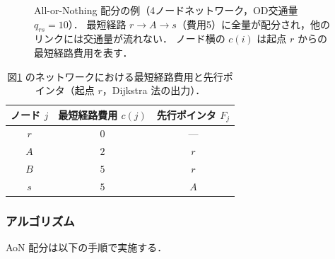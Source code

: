 \begin{figure}[hbtp]
  \centering
  
  \caption{All-or-Nothing 配分の例（4ノードネットワーク，OD交通量 $q_{rs}=10$）．
           最短経路 $r \to A \to s$（費用5）に全量が配分され，他のリンクには交通量が流れない．
           ノード横の $c(i)$ は起点 $r$ からの最短経路費用を表す．}
  \label{fig:aon-example}
\end{figure}

\begin{table}[hbtp]
  \centering
  \caption{図\ref{fig:aon-example} のネットワークにおける最短経路費用と先行ポインタ（起点 $r$，Dijkstra 法の出力）．}
  \label{tab:aon-dijkstra}
  \begin{tabular}{ccc}
    \toprule
    ノード $j$ & 最短経路費用 $c(j)$ & 先行ポインタ $F_j$ \\
    \midrule
    $r$ & $0$ & --- \\
    $A$ & $2$ & $r$ \\
    $B$ & $5$ & $r$ \\
    $s$ & $5$ & $A$ \\
    \bottomrule
  \end{tabular}
\end{table}

\subsubsection*{アルゴリズム}

AoN 配分は以下の手順で実施する\cite{土木学会1998,Sheffi1985}．

